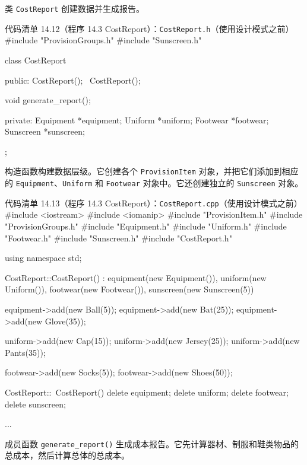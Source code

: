 类 \texttt{Cost\allowbreak{}Report} 创建数据并生成报告。

\begin{codeboxt}{代码清单 14.12（程序 14.3 CostReport）：\texttt{Cost\allowbreak{}Report.\allowbreak{}h}（使用设计模式之前）}
#include "ProvisionGroups.h"
#include "Sunscreen.h"

class CostReport
{
public:
    CostReport();
    ~CostReport();

    void generate_report();

private:
    Equipment *equipment;
    Uniform   *uniform;
    Footwear  *footwear;
    Sunscreen *sunscreen;
};
\end{codeboxt}

构造函数构建数据层级。它创建各个 \texttt{Provision\allowbreak{}Item} 对象，并把它们添加到相应的 \texttt{Equipment}、\texttt{Uniform} 和 \texttt{Footwear} 对象中。它还创建独立的 \texttt{Sunscreen} 对象。

\begin{codeboxt}{代码清单 14.13（程序 14.3 CostReport）：\texttt{Cost\allowbreak{}Report.\allowbreak{}cpp}（使用设计模式之前）}
#include <iostream>
#include <iomanip>
#include "ProvisionItem.h"
#include "ProvisionGroups.h"
#include "Equipment.h"
#include "Uniform.h"
#include "Footwear.h"
#include "Sunscreen.h"
#include "CostReport.h"

using namespace std;

CostReport::CostReport()
    : equipment(new Equipment()), uniform(new Uniform()),
      footwear(new Footwear()), sunscreen(new Sunscreen(5))
{
    equipment->add(new Ball(5));
    equipment->add(new Bat(25));
    equipment->add(new Glove(35));

    uniform->add(new Cap(15));
    uniform->add(new Jersey(25));
    uniform->add(new Pants(35));

    footwear->add(new Socks(5));
    footwear->add(new Shoes(50));
}

CostReport::~CostReport()
{
    delete equipment;
    delete uniform;
    delete footwear;
    delete sunscreen;
}

...
\end{codeboxt}

成员函数 \texttt{generate\_\allowbreak{}report(\allowbreak{})\allowbreak{}} 生成成本报告。它先计算器材、制服和鞋类物品的总成本，然后计算总体的总成本。

